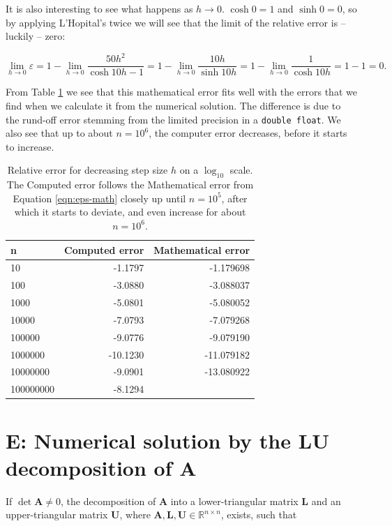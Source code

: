 \documentclass[]{article}
\begin{document}
It is also interesting to see what happens as $h \rightarrow 0$. $\cosh 0 = 1$ and $\sinh 0 = 0$, so by applying L'Hopital's twice we will see that the limit of the relative error is -- luckily -- zero:

\begin{equation*}
\lim_{h \to 0} \varepsilon = 1 - \lim_{h \to 0}\frac{50h^2}{\cosh 10h - 1}  = 1 - \lim_{h \to 0}\frac{10h}{\sinh 10h} = 1 - \lim_{h \to 0}\frac{1}{\cosh 10h} = 1-1 = 0 \text{.}
\end{equation*}

From Table \ref{tab:eps} we see that this mathematical error fits well with the errors that we find when we calculate it from the numerical solution. The difference is due to the rund-off error stemming from the limited precision in a \lstinline|double float|. We also see that up to about $n = 10^6$, the computer error decreases, before it starts to increase.


\begin{table}[ht]
\caption{Relative error for decreasing step size $h$ on a $\log_{10}$ scale. The Computed error follows the Mathematical error from Equation \ref{eqn:eps-math} closely up until $n = 10^5$, after which it starts to deviate, and even increase for about $n = 10^6$.}
\label{tab:eps}
\begin{center}
\begin{tabular}{lrr}
	\toprule
	n &  Computed error &  Mathematical error \\
	\midrule
	10        &   -1.1797 &   -1.179698 \\
	100       &   -3.0880 &   -3.088037 \\
	1000      &   -5.0801 &   -5.080052 \\
	10000     &   -7.0793 &   -7.079268 \\
	100000    &   -9.0776 &   -9.079190 \\
	1000000   &  -10.1230 &  -11.079182 \\
	10000000  &   -9.0901 &  -13.080922 \\
	100000000 &   -8.1294 &             \\
	\bottomrule
\end{tabular}
\end{center}
\end{table}

\section*{E: Numerical solution by the $\mathbf{LU}$ decomposition of $\mathbf{A}$}
If $\det \mathbf{A} \neq 0$, the decomposition of $\mathbf{A}$ into a lower-triangular matrix $\mathbf{L}$ and an upper-triangular matrix $\mathbf{U}$, where $\mathbf{A},\mathbf{L},\mathbf{U} \in \mathbb{R}^{n \times n}$, exists, such that
\end{document}
